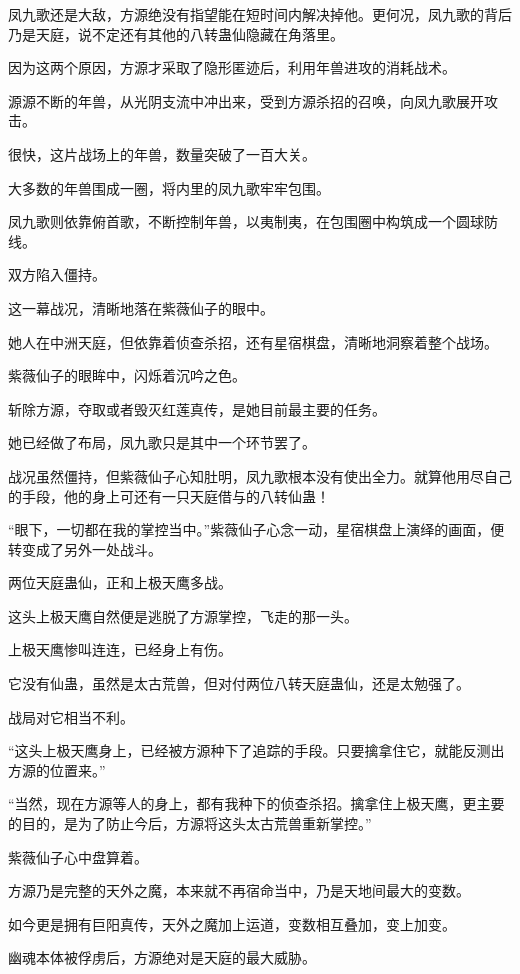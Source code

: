 \begin{this_body}
凤九歌还是大敌，方源绝没有指望能在短时间内解决掉他。更何况，凤九歌的背后乃是天庭，说不定还有其他的八转蛊仙隐藏在角落里。

因为这两个原因，方源才采取了隐形匿迹后，利用年兽进攻的消耗战术。

源源不断的年兽，从光阴支流中冲出来，受到方源杀招的召唤，向凤九歌展开攻击。

很快，这片战场上的年兽，数量突破了一百大关。

大多数的年兽围成一圈，将内里的凤九歌牢牢包围。

凤九歌则依靠俯首歌，不断控制年兽，以夷制夷，在包围圈中构筑成一个圆球防线。

双方陷入僵持。

这一幕战况，清晰地落在紫薇仙子的眼中。

她人在中洲天庭，但依靠着侦查杀招，还有星宿棋盘，清晰地洞察着整个战场。

紫薇仙子的眼眸中，闪烁着沉吟之色。

斩除方源，夺取或者毁灭红莲真传，是她目前最主要的任务。

她已经做了布局，凤九歌只是其中一个环节罢了。

战况虽然僵持，但紫薇仙子心知肚明，凤九歌根本没有使出全力。就算他用尽自己的手段，他的身上可还有一只天庭借与的八转仙蛊！

“眼下，一切都在我的掌控当中。”紫薇仙子心念一动，星宿棋盘上演绎的画面，便转变成了另外一处战斗。

两位天庭蛊仙，正和上极天鹰多战。

这头上极天鹰自然便是逃脱了方源掌控，飞走的那一头。

上极天鹰惨叫连连，已经身上有伤。

它没有仙蛊，虽然是太古荒兽，但对付两位八转天庭蛊仙，还是太勉强了。

战局对它相当不利。

“这头上极天鹰身上，已经被方源种下了追踪的手段。只要擒拿住它，就能反测出方源的位置来。”

“当然，现在方源等人的身上，都有我种下的侦查杀招。擒拿住上极天鹰，更主要的目的，是为了防止今后，方源将这头太古荒兽重新掌控。”

紫薇仙子心中盘算着。

方源乃是完整的天外之魔，本来就不再宿命当中，乃是天地间最大的变数。

如今更是拥有巨阳真传，天外之魔加上运道，变数相互叠加，变上加变。

幽魂本体被俘虏后，方源绝对是天庭的最大威胁。


\end{this_body}
